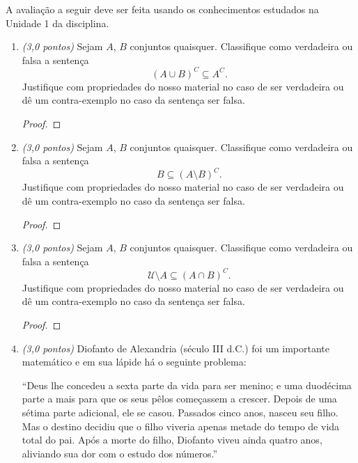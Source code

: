 \documentclass[12pt]{article}
\begin{document}
\maketitle
A avaliação a seguir deve ser feita usando os conhecimentos estudados na Unidade 1 da disciplina.


\begin{enumerate}
     \item \emph{(3{,}0 pontos)} Sejam $A$, $B$ conjuntos quaisquer. Classifique como verdadeira ou falsa a sentença $$(A \cup B)^C \subseteq A^C.$$ Justifique com propriedades do nosso material no caso de ser verdadeira ou dê um contra-exemplo no caso da sentença ser falsa.
           \begin{proof}
           \end{proof}
     \item \emph{(3{,}0 pontos)}  Sejam $A$, $B$ conjuntos quaisquer. Classifique como verdadeira ou falsa a sentença $$B \subseteq (A \setminus B)^C.$$ Justifique com propriedades do nosso material no caso de ser verdadeira ou dê um contra-exemplo no caso da sentença ser falsa.
           \begin{proof}
           \end{proof}
     \item \emph{(3{,}0 pontos)} Sejam $A$, $B$ conjuntos quaisquer. Classifique como verdadeira ou falsa a sentença $$\mathcal U \setminus A \subseteq (A \cap B)^C.$$ Justifique com propriedades do nosso material no caso de ser verdadeira ou dê um contra-exemplo no caso da sentença ser falsa.
           \begin{proof}
           \end{proof}

     \item \emph{(3{,}0 pontos)} Diofanto de Alexandria (século III d.C.) foi um importante matemático e em sua lápide há o seguinte problema:

           ``Deus lhe concedeu a sexta parte da vida para ser menino; e uma duodécima parte a mais para que os seus pêlos começassem a crescer. Depois de uma sétima parte adicional, ele se casou. Passados cinco anos, nasceu seu filho. Mas o destino decidiu que o filho viveria apenas metade do tempo de vida total do pai. Após a morte do filho, Diofanto viveu ainda quatro anos, aliviando sua dor com o estudo dos números.''


\end{enumerate}
\end{document}
